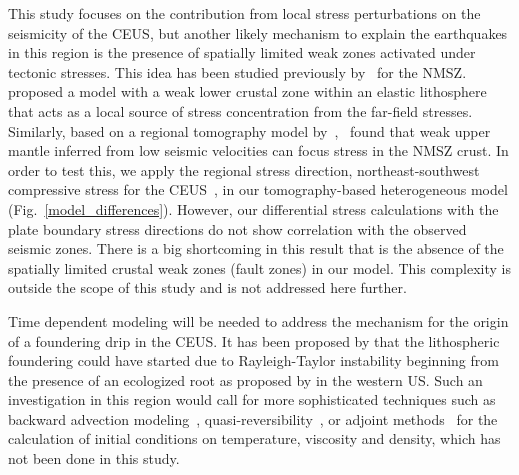 \documentclass[draft,linenumbers]{agujournal2018}
\begin{document}
This study focuses on the contribution from local stress perturbations on the seismicity of the CEUS, but another likely mechanism to explain the earthquakes in this region is the presence of spatially limited weak zones activated under tectonic stresses. This idea has been studied previously by~\citet{Kenner_2000a,  zhan2016stress} for the NMSZ.~\citet{Kenner_2000a} proposed a model with a weak lower crustal zone within an elastic lithosphere that acts as a local source of stress concentration from the far-field stresses. Similarly, based on a regional tomography model by~\citet{pollitz2014seismic},~\citet{zhan2016stress} found that weak upper mantle inferred from low seismic velocities can focus stress in the NMSZ crust. In order to test this, we apply the regional stress direction,  northeast-southwest compressive stress for the CEUS~\citep{zoback1989tectonic}, in our tomography-based heterogeneous model (Fig.~\ref{model_differences}). However, our differential stress calculations with the plate boundary stress directions do not show correlation with the observed seismic zones. There is a big shortcoming in this result that is the absence of the spatially limited crustal weak zones (fault zones) in our model. This complexity is outside the scope of this study and is not addressed here further.     
     
Time dependent modeling will be needed to address the mechanism for the origin of a foundering drip in the CEUS. It has been proposed by \cite{Biryol_2016} that the lithospheric foundering could have started due to Rayleigh-Taylor instability beginning from the presence of an ecologized root as proposed by \citet{le2006mantle} in the western US. Such an investigation in this region would call for more sophisticated techniques such as backward advection modeling~\citep[e.g.,][]{conrad2003seismic}, quasi-reversibility~\citep{glivsovic2016new}, or adjoint methods~\citep[e.g.,][]{bunge2003mantle, liu2008reconstructing} for the calculation of initial conditions on temperature, viscosity and density, which has not been done in this study.
\end{document}
